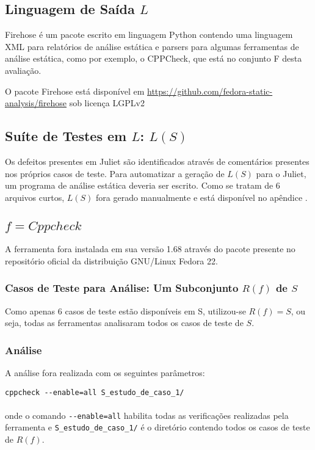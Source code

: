 \subsection{Linguagem de Saída $L$}

Firehose é um pacote escrito em linguagem Python contendo uma linguagem XML para relatórios de análise estática e parsers para algumas ferramentas de análise estática, como por exemplo, o CPPCheck, que está no conjunto F desta avaliação.

O pacote Firehose está disponível em \url{https://github.com/fedora-static-analysis/firehose} sob licença LGPLv2

\subsection{Suíte de Testes em $L$: $L(S)$}

Os defeitos presentes em Juliet são identificados através de comentários presentes nos próprios casos de teste. Para automatizar a geração de $L(S)$ para o Juliet, um programa de análise estática deveria ser escrito. Como se tratam de 6 arquivos curtos, $L(S)$ fora gerado manualmente e está disponível no apêndice .

\subsection{$f = Cppcheck$}

A ferramenta fora instalada em sua versão 1.68 através do pacote presente no repositório oficial da distribuição GNU/Linux Fedora 22.

\subsubsection{Casos de Teste para Análise: Um Subconjunto $R(f)$ de $S$}

Como apenas 6 casos de teste estão disponíveis em S, utilizou-se $R(f) = S$, ou seja, todas as ferramentas analisaram todos os casos de teste de $S$.

\subsubsection{Análise}

A análise fora realizada com os seguintes parâmetros:

\lstinline{cppcheck --enable=all S_estudo_de_caso_1/}\\\\
onde o comando \lstinline{--enable=all} habilita todas as verificações realizadas pela ferramenta e \lstinline{S_estudo_de_caso_1/} é o diretório contendo todos os casos de teste de $R(f)$.

